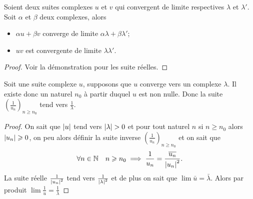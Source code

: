 \begin{prop}
  Soient deux suites complexes $u$ et $v$ qui convergent de limite respectives $\lambda$ et $\lambda'$. Soit $\alpha$ et $\beta$ deux complexes, alors
  \begin{itemize}
  \item $\alpha u + \beta v$ converge de limite $\alpha \lambda + \beta \lambda'$;
  \item $uv$ est convergente de limite $\lambda \lambda'$.
  \end{itemize}
\end{prop}
\begin{proof} Voir la démonstration pour les suite réelles.
\end{proof}
\begin{prop}
  Soit une suite complexe $u$, supposons que $u$ converge vers un complexe $\lambda$. Il existe donc un naturel $n_0$ à partir duquel $u$ est non nulle. Donc la suite $\left(\frac{1}{u_n}\right)_{n \geqslant n_0}$ tend vers $\frac{1}{\lambda}$.
\end{prop}
\begin{proof}
  On sait que $\left\lvert u\right\rvert$ tend vers $\left\lvert\lambda\right\rvert>0$ et pour tout naturel $n$ si $n \geqslant n_0$ alors $\left\lvert u_n\right\rvert \geqslant 0$, on peu alors définir la suite inverse $\left(\frac{1}{u_n}\right)_{n \geqslant n_0}$ et on sait que
  \begin{equation}
    \forall n \in \mathbb{N} \quad n \geqslant n_0 \implies \frac{1}{u_n}=\frac{\overline{u_n}}{\left\lvert u_n\right\rvert^2}.
  \end{equation}
La suite réelle $\frac{1}{\left\lvert u_n\right\rvert^2}$ tend vers $\frac{1}{\left\lvert\lambda\right\rvert^2}$ et de plus on sait que $\lim \bar{u}=\bar{\lambda}$. Alors par produit $\lim \frac{1}{u}=\frac{1}{\lambda}$
\end{proof}
